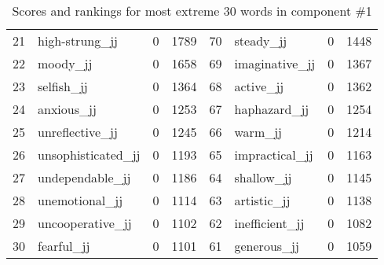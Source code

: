 \begin{table}[tbp]
\begin{tabular}{| rlr@{.}l | rlr@{.}l |}
    21 & high-strung\_jj & 0 & 1789    &    70 & steady\_jj & 0 & 1448 \\
    22 & moody\_jj & 0 & 1658    &    69 & imaginative\_jj & 0 & 1367 \\
    23 & selfish\_jj & 0 & 1364    &    68 & active\_jj & 0 & 1362 \\
    24 & anxious\_jj & 0 & 1253    &    67 & haphazard\_jj & 0 & 1254 \\
    25 & unreflective\_jj & 0 & 1245    &    66 & warm\_jj & 0 & 1214 \\
    26 & unsophisticated\_jj & 0 & 1193    &    65 & impractical\_jj & 0 & 1163 \\
    27 & undependable\_jj & 0 & 1186    &    64 & shallow\_jj & 0 & 1145 \\
    28 & unemotional\_jj & 0 & 1114    &    63 & artistic\_jj & 0 & 1138 \\
    29 & uncooperative\_jj & 0 & 1102    &    62 & inefficient\_jj & 0 & 1082 \\
    30 & fearful\_jj & 0 & 1101    &    61 & generous\_jj & 0 & 1059 \\
    \hline
    \end{tabular}
    \caption{Scores and rankings for most extreme 30 words in component \#1} 
\end{table}
\clearpage

